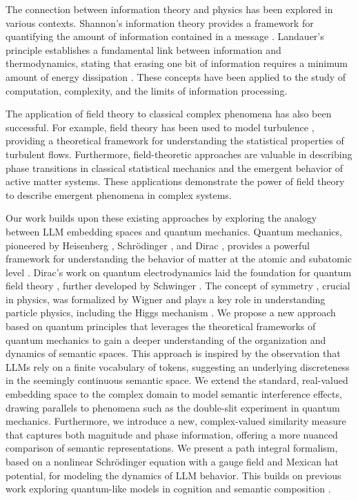 \documentclass[prd,amsmath,amssymb,12pt]{revtex4}
\begin{document}
The connection between information theory and physics has been explored in various contexts.
Shannon's information theory provides a framework for quantifying the amount of information
contained in a message \cite{shannon}. Landauer's principle establishes a fundamental link between
information and thermodynamics, stating that erasing one bit of information requires a minimum
amount of energy dissipation \cite{landauer}. These concepts have been applied to the study of
computation, complexity, and the limits of information processing.

The application of field theory to classical complex phenomena has also been successful.
For example, field theory has been used to model turbulence \cite{laine}, providing a theoretical
framework for understanding the statistical properties of turbulent flows. Furthermore,
field-theoretic approaches are valuable in describing phase transitions in classical
statistical mechanics \cite{cardy} and the emergent behavior of active
matter systems. These applications demonstrate the power of field theory to describe
emergent phenomena in complex systems.

Our work builds upon these existing approaches by exploring the analogy between LLM embedding
spaces and quantum mechanics. Quantum mechanics, pioneered by Heisenberg \citep{heisenberg1925},
Schrödinger \citep{schrodinger}, and Dirac \citep{dirac1925}, provides a powerful framework
for understanding the behavior of matter at the atomic and subatomic level \citep{merzbacher}.
Dirac's work on
quantum electrodynamics \citep{dirac1927, dirac1930} laid the foundation for quantum field theory
\citep{ramond, kaku, bertkmann},
further developed by Schwinger \citep{schwinger}. The concept of symmetry \citep{coleman}, crucial
in physics, was formalized by Wigner \citep{wigner} and plays a key role in understanding
particle physics, including the Higgs mechanism \citep{higgs, englert, guralnik}.
We propose a new approach based on quantum principles that leverages the theoretical frameworks of
quantum mechanics to gain a deeper understanding of the organization and dynamics of semantic
spaces. This approach is inspired by the observation that LLMs rely on a finite vocabulary of
tokens, suggesting an underlying discreteness in the seemingly continuous semantic space. We
extend the standard, real-valued embedding space to the complex domain to model semantic
interference effects, drawing parallels to phenomena such as the double-slit experiment in
quantum mechanics. Furthermore, we introduce a new, complex-valued similarity measure that
captures both magnitude and phase information, offering a more nuanced comparison of semantic
representations. We present a path integral formalism, based on a nonlinear Schrödinger
equation with a gauge field and Mexican hat potential, for modeling the dynamics of LLM behavior.
This builds on previous work exploring quantum-like models in cognition \citep{bruza,
busemeyer, atmanspacher} and semantic composition \citep{widdows}.
\end{document}
